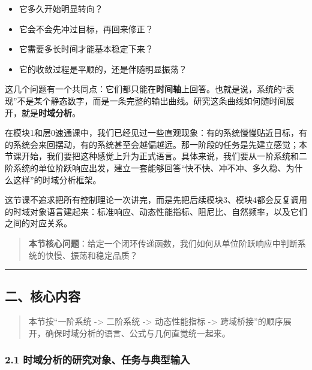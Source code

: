\documentclass[
  11pt]{article}
\providecommand{\tightlist}{%
  \setlength{\itemsep}{0pt}\setlength{\parskip}{0pt}}
\begin{document}
\begin{itemize}
\tightlist
\item
  它多久开始明显转向？
\item
  它会不会先冲过目标，再回来修正？
\item
  它需要多长时间才能基本稳定下来？
\item
  它的收敛过程是平顺的，还是伴随明显振荡？
\end{itemize}

这几个问题有一个共同点：它们都只能在\textbf{时间轴}上回答。也就是说，系统的``表现''不是某个静态数字，而是一条完整的输出曲线。研究这条曲线如何随时间展开，就是\textbf{时域分析}。

在模块1和层0速通课中，我们已经见过一些直观现象：有的系统慢慢贴近目标，有的系统会来回摆动，有的系统甚至会越偏越远。那一阶段的任务是先建立感觉；本节课开始，我们要把这种感觉上升为正式语言。具体来说，我们要从一阶系统和二阶系统的单位阶跃响应出发，建立一套能够回答``快不快、冲不冲、多久稳、为什么这样''的时域分析框架。

这节课不追求把所有控制理论一次讲完，而是先把后续模块3、模块4都会反复调用的时域对象语言建起来：标准响应、动态性能指标、阻尼比、自然频率，以及它们之间的对应关系。

\begin{quote}
\textbf{本节核心问题}：给定一个闭环传递函数，我们如何从单位阶跃响应中判断系统的快慢、振荡和稳定品质？
\end{quote}

\begin{center}\rule{0.5\linewidth}{0.5pt}\end{center}

\subsection{二、核心内容}\label{ux4e8cux6838ux5fc3ux5185ux5bb9}

\begin{quote}
本节按``一阶系统 -\textgreater{} 二阶系统 -\textgreater{} 动态性能指标
-\textgreater{}
跨域桥接''的顺序展开，确保时域分析的语言、公式与几何直觉统一起来。
\end{quote}

\subsubsection{2.1
时域分析的研究对象、任务与典型输入}\label{ux65f6ux57dfux5206ux6790ux7684ux7814ux7a76ux5bf9ux8c61ux4efbux52a1ux4e0eux5178ux578bux8f93ux5165}
\end{document}
